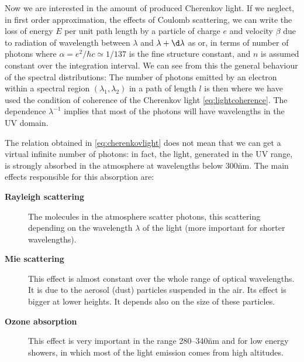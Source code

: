 Now we are interested in the amount of produced Cherenkov light. If we
neglect, in first order approximation, the effects of Coulomb
scattering, we can write the loss of energy $E$ per unit path length
by a particle of charge $e$ and velocity $\beta$ due to \Cherenkov
radiation of wavelength between $\lambda$ and $\lambda+\d \lambda$ as
%
\dEdheq
%
or, in terms of number of photons
%
\dNdheq
%
where $\alpha = e^2/\hbar c \simeq 1/137$ is the fine structure
constant, and $n$ is assumed constant over the integration interval.
We can see from this the general behaviour of the spectral
distributions:
%
\specdistreq
%
The number of photons emitted by an electron within a spectral region
$(\lambda_1,\lambda_2)$ in a path of length $l$ is then
%
\phemiteq
%
where we have used the condition of coherence of the Cherenkov light
\eqref{eq:lightcoherence}. The dependence $\lambda^{-1}$ implies that
most of the photons will have wavelengths in the UV domain.

The relation obtained in \eqref{eq:cherenkovlight} does not mean that
we can get a virtual infinite number of \Cherenkov photons: in fact,
the \Cherenkov light, generated in the UV range, is strongly absorbed
in the atmosphere at wavelengths below 300\u{nm}. The main effects
responsible for this absorption are:

\begin{description}
  
\item[\textbf{Rayleigh scattering}] The molecules in the atmosphere
  scatter photons, this scattering depending on the wavelength
  $\lambda$ of the light (more important for shorter wavelengths).
  
\item[\textbf{Mie scattering}] This effect is almost constant over the
  whole range of optical wavelengths. It is due to the aerosol (dust)
  particles suspended in the air. Its effect is bigger at lower
  heights. It depends also on the size of these particles.
  
\item[\textbf{Ozone absorption}] This effect is very important in the
  range 280--340\u{nm} and for low energy showers, in which most of
  the \Cherenkov light emission comes from high altitudes.

\end{description}


